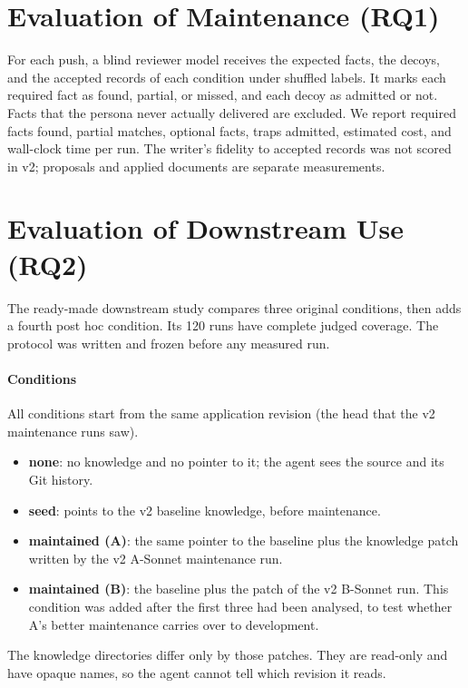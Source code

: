\section{Evaluation of Maintenance (RQ1)}

For each push, a blind reviewer model receives the expected facts, the decoys, and the accepted records of each condition under shuffled labels. It marks each required fact as found, partial, or missed, and each decoy as admitted or not. Facts that the persona never actually delivered are excluded. We report required facts found, partial matches, optional facts, traps admitted, estimated cost, and wall-clock time per run. The writer's fidelity to accepted records was not scored in v2; proposals and applied documents are separate measurements.

\section{Evaluation of Downstream Use (RQ2)}
\label{sec:downstream-method}

The ready-made downstream study compares three original conditions, then adds a fourth post hoc condition. Its 120 runs have complete judged coverage. The protocol was written and frozen before any measured run.

\paragraph{Conditions} All conditions start from the same application revision (the head that the v2 maintenance runs saw).
\begin{itemize}[nosep]
  \item \textbf{none}: no knowledge and no pointer to it; the agent sees the source and its Git history.
  \item \textbf{seed}:  points to the v2 baseline knowledge, before maintenance.
  \item \textbf{maintained (A)}: the same pointer to the baseline plus the knowledge patch written by the v2 A-Sonnet maintenance run.
  \item \textbf{maintained (B)}: the baseline plus the patch of the v2 B-Sonnet run. This condition was added after the first three had been analysed, to test whether A's better maintenance carries over to development.
\end{itemize}
The knowledge directories differ only by those patches. They are read-only and have opaque names, so the agent cannot tell which revision it reads.

